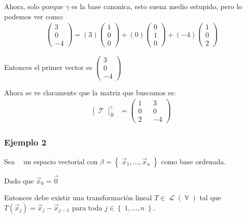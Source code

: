 \documentclass[12pt, fleqn]{report}                             %
\theoremstyle{break}                                            %
\DeclareMathOperator \GenericField {\mathbb{F}}                 %
\DeclareMathOperator \VectorSet    {\mathbb{V}}                 %
\DeclareMathOperator \VectorSpace  {\VectorSet_{\GenericField}} %
\DeclareMathOperator \LinTrans      {\mathcal{T}}               %
\DeclareMathOperator \Laplace       {\mathcal{L}}               %
\newcommand{\Set}[1]            {\left\{ \; #1 \; \right\}}     %
\newcommand{\bigBrackets}[1]    {\big[ \; #1 \; \big]}          %
\newcommand{\pVector}[1]                                        %
        { \ensuremath{\begin{pmatrix}#1\end{pmatrix}} }             %
\begin{document}
\begin{itemize}
                            Ahora, solo porque $\gamma$ es la base canonica, esto suena medio estupido, pero
                            lo podemos ver como:
                            \begin{align*}
                                \pVector{3\\0\\-4} 
                                    = (3)\pVector{1\\0\\0} + (0)\pVector{0\\1\\0} + (-4)\pVector{1\\0\\2}
                            \end{align*}

                            Entonces el primer vector es $\pVector{3\\0\\-4}$

                    \end{itemize}

                    Ahora se ve claramente que la matriz que buscamos es:
                    \begin{align*}
                        \bigBrackets{\LinTrans}_{B}^{\gamma}
                            &= \pVector{1 && 3 \\ 0 && 0 \\ 2 && -4}
                    \end{align*}

                \clearpage
                \subsubsection{Ejemplo 2}

                    Sea $\VectorSpace$ un espacio vectorial con $\beta = \Set{\vec x_1, \dots , \vec x_n}$ 
                    como base ordenada.

                    Dado que $\vec x_0 = \vec 0$

                    Entonces debe existir una transformación lineal $T \in \Laplace(\VectorSet)$ tal
                    que $T(\vec x_j) = \vec x_j - \vec x_{j - 1}$ para toda $j \in \Set{1, \dots, n}$.
\end{document}
